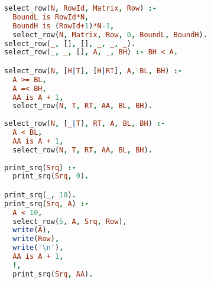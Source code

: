 \begin{lstlisting}[language=Prolog]
select_row(N, RowId, Matrix, Row) :-  
  BoundL is RowId*N, 
  BoundH is (RowId+1)*N-1, 
  select_row(N, Matrix, Row, 0, BoundL, BoundH).
select_row(_, [], [], _, _, _).
select_row(_, _, [], A, _, BH) :- BH < A.

select_row(N, [H|T], [H|RT], A, BL, BH) :-
  A >= BL,
  A =< BH,
  AA is A + 1,
  select_row(N, T, RT, AA, BL, BH).
  
select_row(N, [_|T], RT, A, BL, BH) :-
  A < BL,
  AA is A + 1,
  select_row(N, T, RT, AA, BL, BH).
  
print_srq(Srq) :-
  print_srq(Srq, 0).

print_srq(_, 10).  
print_srq(Srq, A) :-
  A < 10,
  select_row(5, A, Srq, Row), 
  write(A),
  write(Row), 
  write('\n'),
  AA is A + 1,
  !,
  print_srq(Srq, AA).
\end{lstlisting}